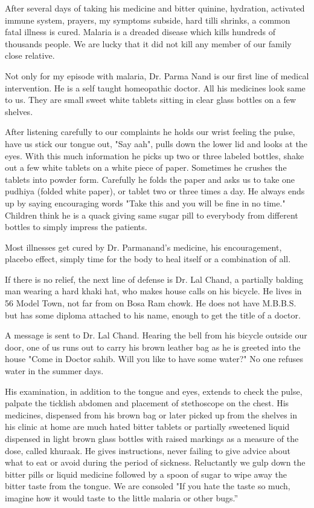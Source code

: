 After several days of taking his medicine and bitter quinine, hydration,
activated immune system, prayers, my symptoms subside, hard tilli shrinks,
a common fatal illness is cured. Malaria is a dreaded disease which kills
hundreds of thousands people. We are lucky that it did not kill any member
of our family close relative. 

Not only for my episode with malaria, Dr. Parma Nand is our first line of
medical intervention. He is a self taught homeopathic doctor. All his
medicines look same to us. They are small sweet white tablets sitting in
clear glass bottles on a few shelves. 

After listening carefully to our complaints he holds our wrist feeling the
pulse, have us stick our tongue out, "Say aah", pulls down the lower lid
and looks at the eyes. With this much information he picks up two or three
labeled bottles, shake out a few white tablets on a white piece of paper.
Sometimes he crushes the tablets into powder form. Carefully he  folds the
paper and asks us to take one pudhiya (folded white paper), or tablet two
or three times a day. He always ends up by saying encouraging words "Take
this and you will be fine in no time."  Children think he is a quack
giving same sugar pill to everybody from different bottles to simply
impress the patients. 

Most illnesses get cured by Dr. Parmanand's medicine, his encouragement,
placebo effect, simply time for the body to heal itself or a combination
of all. 

If there is no relief, the next line of defense is Dr. Lal Chand,
a partially balding man wearing a hard khaki hat, who makes house calls on
his bicycle. He lives in 56 Model Town, not far from on Bosa Ram chowk.
He does not have M.B.B.S. but has some diploma attached to his name,
enough to get the title of a doctor. 

A message is sent to Dr. Lal Chand. Hearing the bell from his bicycle
outside our door, one of us runs out to carry his brown leather bag as he
is greeted into the house "Come in Doctor sahib. Will you like to have
some water?"  No one refuses water in the summer days. 

His examination, in addition to the tongue and eyes, extends to check the
pulse, palpate the ticklish abdomen and placement of stethoscope on the
chest. His medicines, dispensed from his brown bag or later picked up from
the shelves in his clinic at home are much hated bitter tablets or
partially sweetened liquid dispensed in light brown glass bottles with
raised markings as a measure of the dose, called khuraak. He gives
instructions, never failing to give advice about what to eat or avoid
during the period of sickness. Reluctantly we gulp down the bitter pills
or liquid medicine followed by a spoon of sugar to wipe away the bitter
taste from the tongue. We are consoled "If you hate the taste so much,
imagine how it would taste to the little malaria or other bugs.”

